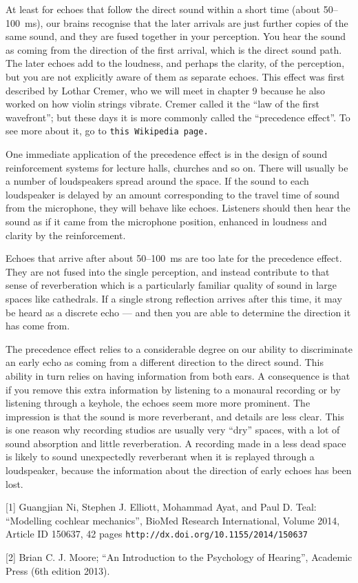   At least for echoes that follow the direct sound within a short time (about 
  50--100 ms), our brains recognise that the later arrivals are just further 
  copies of the same sound, and they are fused together in your perception. You 
  hear the sound as coming from the direction of the first arrival, which is 
  the direct sound path. The later echoes add to the loudness, and perhaps the 
  clarity, of the perception, but you are not explicitly aware of them as 
  separate echoes. This effect was first described by Lothar Cremer, who we 
  will meet in chapter 9 because he also worked on how violin strings vibrate. 
  Cremer called it the “law of the first wavefront”; but these days it is more 
  commonly called the “precedence effect”. To see more about it, go to 
  \tt{}this Wikipedia page\rm{}. 

  One immediate application of the precedence effect is in the design of sound 
  reinforcement systems for lecture halls, churches and so on. There will 
  usually be a number of loudspeakers spread around the space. If the sound to 
  each loudspeaker is delayed by an amount corresponding to the travel time of 
  sound from the microphone, they will behave like echoes. Listeners should 
  then hear the sound as if it came from the microphone position, enhanced in 
  loudness and clarity by the reinforcement. 

  Echoes that arrive after about 50--100~ms are too late for the precedence 
  effect. They are not fused into the single perception, and instead contribute 
  to that sense of reverberation which is a particularly familiar quality of 
  sound in large spaces like cathedrals. If a single strong reflection arrives 
  after this time, it may be heard as a discrete echo — and then you are able 
  to determine the direction it has come from. 

  The precedence effect relies to a considerable degree on our ability to 
  discriminate an early echo as coming from a different direction to the direct 
  sound. This ability in turn relies on having information from both ears. A 
  consequence is that if you remove this extra information by listening to a 
  monaural recording or by listening through a keyhole, the echoes seem more 
  more prominent. The impression is that the sound is more reverberant, and 
  details are less clear. This is one reason why recording studios are usually 
  very “dry” spaces, with a lot of sound absorption and little reverberation. A 
  recording made in a less dead space is likely to sound unexpectedly 
  reverberant when it is replayed through a loudspeaker, because the 
  information about the direction of early echoes has been lost. 



  \sectionreferences{}[1] Guangjian Ni, Stephen J. Elliott, Mohammad Ayat, and 
  Paul D. Teal: ``Modelling cochlear mechanics'', BioMed Research 
  International, Volume 2014, Article ID 150637, 42 pages 
  \tt{}http://dx.doi.org/10.1155/2014/150637\rm{} 

  [2] Brian C. J. Moore; ``An Introduction to the Psychology of Hearing'', 
  Academic Press (6th edition 2013). 